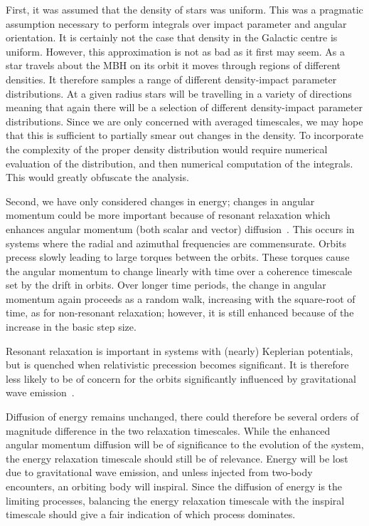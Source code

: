 \documentclass[useAMS,usedcolumn,usegraphicx,usenatbib]{mn2e}
\begin{document}
\begin{onecolumn}
First, it was assumed that the density of stars was uniform. This was a pragmatic assumption necessary to perform integrals over impact parameter and angular orientation. It is certainly not the case that density in the Galactic centre is uniform. However, this approximation is not as bad as it first may seem. As a star travels about the MBH on its orbit it moves through regions of different densities. It therefore samples a range of different density-impact parameter distributions. At a given radius stars will be travelling in a variety of directions meaning that again there will be a selection of different density-impact parameter distributions. Since we are only concerned with averaged timescales, we may hope that this is sufficient to partially smear out changes in the density. To incorporate the complexity of the proper density distribution would require numerical evaluation of the distribution, and then numerical computation of the integrals. This would greatly obfuscate the analysis.

Second, we have only considered changes in energy; changes in angular momentum could be more important because of resonant relaxation which enhances angular momentum (both scalar and vector) diffusion~\citep{Rauch1996,Rauch1998,Gurkan2007,Eilon2009}. This occurs in systems where the radial and azimuthal frequencies are commensurate. Orbits precess slowly leading to large torques between the orbits. These torques cause the angular momentum to change linearly with time over a coherence timescale set by the drift in orbits. Over longer time periods, the change in angular momentum again proceeds as a random walk, increasing with the square-root of time, as for non-resonant relaxation; however, it is still enhanced because of the increase in the basic step size.

Resonant relaxation is important in systems with (nearly) Keplerian potentials, but is quenched when relativistic precession becomes significant. It is therefore less likely to be of concern for the orbits significantly influenced by gravitational wave emission~\citep{Sigurdsson1997}.

Diffusion of energy remains unchanged, there could therefore be several orders of magnitude difference in the two relaxation timescales. While the enhanced angular momentum diffusion will be of significance to the evolution of the system, the energy relaxation timescale should still be of relevance. Energy will be lost due to gravitational wave emission, and unless injected from two-body encounters, an orbiting body will inspiral. Since the diffusion of energy is the limiting processes, balancing the energy relaxation timescale with the inspiral timescale should give a fair indication of which process dominates.


\end{onecolumn}
\end{document}
